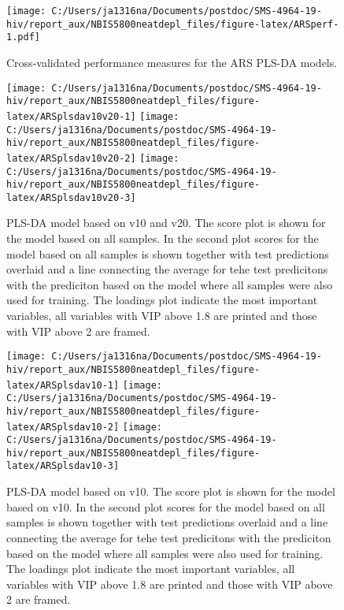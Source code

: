 \documentclass[
]{article}
\begin{document}
\begin{figure}
\centering
\texttt{[image: C:/Users/ja1316na/Documents/postdoc/SMS-4964-19-hiv/report\_aux/NBIS5800neatdepl\_files/figure-latex/ARSperf-1.pdf]}
\caption{\label{fig:ARSperf}Cross-validated performance measures for the ARS PLS-DA models.}
\end{figure}

\begin{figure}
\texttt{[image: C:/Users/ja1316na/Documents/postdoc/SMS-4964-19-hiv/report\_aux/NBIS5800neatdepl\_files/figure-latex/ARSplsdav10v20-1]} \texttt{[image: C:/Users/ja1316na/Documents/postdoc/SMS-4964-19-hiv/report\_aux/NBIS5800neatdepl\_files/figure-latex/ARSplsdav10v20-2]} \texttt{[image: C:/Users/ja1316na/Documents/postdoc/SMS-4964-19-hiv/report\_aux/NBIS5800neatdepl\_files/figure-latex/ARSplsdav10v20-3]} \caption{PLS-DA model based on v10 and v20. The score plot is shown for the model based on all samples. In the second plot scores for the model based on all samples is shown together with test predictions overlaid and a line connecting the average for tehe test predicitons with the prediciton based on the model where all samples were also used for training. The loadings plot indicate the most important variables, all variables with VIP above 1.8 are printed and those with VIP above 2 are framed.}\label{fig:ARSplsdav10v20}
\end{figure}

\begin{figure}
\texttt{[image: C:/Users/ja1316na/Documents/postdoc/SMS-4964-19-hiv/report\_aux/NBIS5800neatdepl\_files/figure-latex/ARSplsdav10-1]} \texttt{[image: C:/Users/ja1316na/Documents/postdoc/SMS-4964-19-hiv/report\_aux/NBIS5800neatdepl\_files/figure-latex/ARSplsdav10-2]} \texttt{[image: C:/Users/ja1316na/Documents/postdoc/SMS-4964-19-hiv/report\_aux/NBIS5800neatdepl\_files/figure-latex/ARSplsdav10-3]} \caption{PLS-DA model based on v10. The score plot is shown for the model based on v10. In the second plot scores for the model based on all samples is shown together with test predictions overlaid and a line connecting the average for tehe test predicitons with the prediciton based on the model where all samples were also used for training. The loadings plot indicate the most important variables, all variables with VIP above 1.8 are printed and those with VIP above 2 are framed.}\label{fig:ARSplsdav10}
\end{figure}
\end{document}
